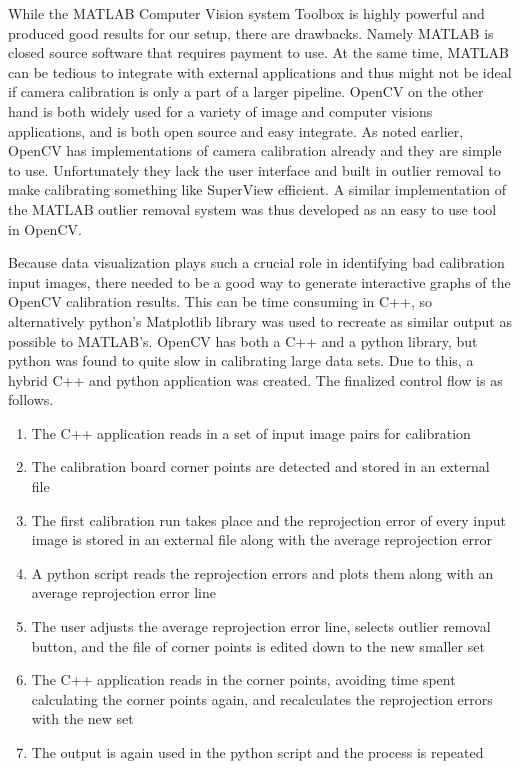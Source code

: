 While the MATLAB Computer Vision system Toolbox is highly powerful and produced good results for our setup, there are drawbacks. Namely MATLAB is closed source software that requires payment to use. At the same time, MATLAB can be tedious to integrate with external applications and thus might not be ideal if camera calibration is only a part of a larger pipeline. OpenCV on the other hand is both widely used for a variety of image and computer visions applications, and is both open source and easy integrate. As noted earlier, OpenCV has implementations of camera calibration already and they are simple to use. Unfortunately they lack the user interface and built in outlier removal to make calibrating something like SuperView efficient. A similar implementation of the MATLAB outlier removal system was thus developed as an easy to use tool in OpenCV.

Because data visualization plays such a crucial role in identifying bad calibration input images, there needed to be a good way to generate interactive graphs of the OpenCV calibration results. This can be time consuming in C++, so alternatively python's Matplotlib library was used to recreate as similar output as possible to MATLAB's. OpenCV has both a C++ and a python library, but python was found to quite slow in calibrating large data sets. Due to this, a hybrid C++ and python application was created. The finalized control flow is as follows. 

\begin{enumerate}
	\item The C++ application reads in a set of input image pairs for calibration
	\item The calibration board corner points are detected and stored in an external file
	\item The first calibration run takes place and the reprojection error of every input image is stored in an external file along with the average reprojection error
	\item A python script reads the reprojection errors and plots them along with an average reprojection error line
	\item The user adjusts the average reprojection error line, selects outlier removal button, and the file of corner points is edited down to the new smaller set
	\item The C++ application reads in the corner points, avoiding time spent calculating the corner points again, and recalculates the reprojection errors with the new set
	\item The output is again used in the python script and the process is repeated
\end{enumerate}

